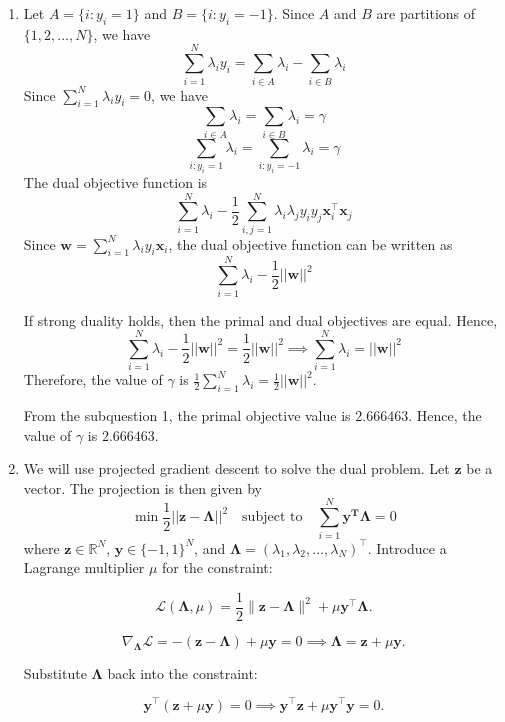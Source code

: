 \documentclass[12pt,a4paper]{article}
\theoremstyle{remark}
\begin{document}
\begin{enumerate}
    \item Let $A = \{i: y_i = 1\}$ and $B = \{i: y_i = -1\}$. Since $A$ and $B$ are partitions of $\{1, 2, \ldots, N\}$, we have
    \[
        \sum_{i = 1}^N \lambda_i y_i = \sum_{i \in A} \lambda_i - \sum_{i \in B} \lambda_i
    \]
    Since $\sum_{i = 1}^N \lambda_i y_i = 0$, we have
    \[
        \sum_{i \in A} \lambda_i = \sum_{i \in B} \lambda_i = \gamma
    \]
    \[
        \sum_{i: y_i = 1} \lambda_i = \sum_{i: y_i = -1} \lambda_i = \gamma
    \]
    The dual objective function is \[\sum_{i = 1}^N \lambda_i - \frac{1}{2} \sum_{i, j = 1}^N \lambda_i \lambda_j y_i y_j \mathbf{x}_i^\top \mathbf{x}_j\]
    Since $\mathbf{w} = \sum_{i = 1}^N \lambda_i y_i \mathbf{x}_i$, the dual objective function can be written as
    \[
        \sum_{i = 1}^N \lambda_i - \frac{1}{2} ||\mathbf{w}||^2
    \]
    
    If strong duality holds, then the primal and dual objectives are equal. Hence, $$\sum_{i = 1}^N \lambda_i - \frac{1}{2} ||\mathbf{w}||^2 = \frac{1}{2} ||\mathbf{w}||^2 \implies \sum_{i = 1}^N \lambda_i = ||\mathbf{w}||^2$$
    Therefore, the value of $\gamma$ is $\frac{1}{2} \sum_{i = 1}^N \lambda_i = \frac{1}{2} ||\mathbf{w}||^2$.

    From the subquestion 1, the primal objective value is $2.666463$. Hence, the value of $\gamma$ is $2.666463$.

    \item We will use projected gradient descent to solve the dual problem. Let $\mathbf{z}$ be a vector. The projection is then given by $$\min \frac{1}{2} ||\mathbf{z} - \mathbf{\Lambda}||^2 \quad \text{subject to} \quad \sum_{i = 1}^N \mathbf{y^T \Lambda} = 0$$ where \(\mathbf{z} \in \mathbb{R}^N\), \(\mathbf{y} \in \{-1, 1\}^N\), and \(\mathbf{\Lambda} = (\lambda_1, \lambda_2, \dots, \lambda_N)^\top\). Introduce a Lagrange multiplier \(\mu\) for the constraint:

\[
\mathcal{L}(\mathbf{\Lambda}, \mu) = \frac{1}{2} \|\mathbf{z} - \mathbf{\Lambda}\|^2 + \mu \mathbf{y}^\top \mathbf{\Lambda}.
\]

\[
\nabla_{\mathbf{\Lambda}} \mathcal{L} = -(\mathbf{z} - \mathbf{\Lambda}) + \mu \mathbf{y} = 0 \implies \mathbf{\Lambda} = \mathbf{z} + \mu \mathbf{y}.
\]

Substitute \(\mathbf{\Lambda}\) back into the constraint:

\[
\mathbf{y}^\top (\mathbf{z} + \mu \mathbf{y}) = 0 \implies \mathbf{y}^\top \mathbf{z} + \mu \mathbf{y}^\top \mathbf{y} = 0.
\]


\end{enumerate}
\end{document}
